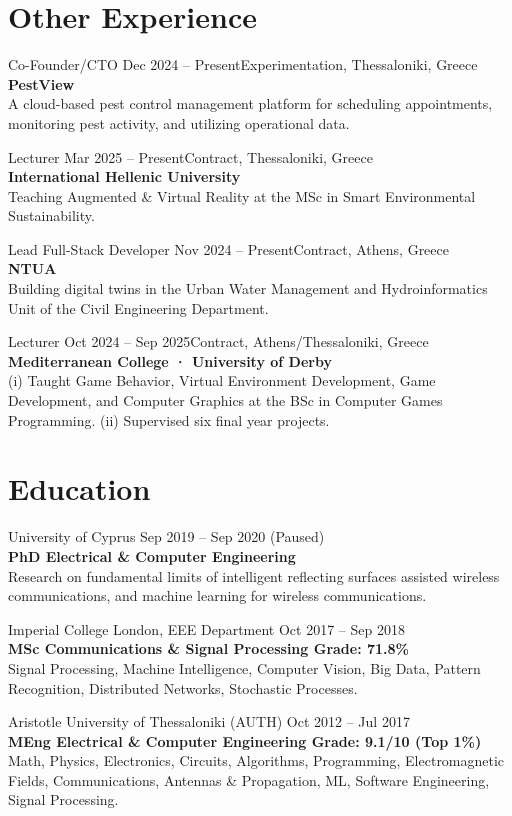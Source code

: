 \documentclass[a4paper,10pt]{article}
\newcommand{\entry}[4]{%
  \vspace{5pt}
  {\fontsize{9}{11}\selectfont\color{texttertiary}#1\hfill#2}\\[1pt]
  {\fontsize{10.5}{13}\selectfont\bfseries #3}\\[1pt]
  {\fontsize{9}{12}\selectfont\color{textsecondary}#4}
  \vspace{2pt}
}
\newcommand{\entrycompact}[3]{%
  \vspace{4pt}
  {\fontsize{9}{11}\selectfont\color{texttertiary}#1}\\[1pt]
  {\fontsize{10}{12}\selectfont\bfseries #2}\\[1pt]
  {\fontsize{9}{12}\selectfont\color{textsecondary}#3}
  \vspace{1pt}
}
\begin{document}
\section{Other Experience}

\entry{Co-Founder/CTO \hfill Dec 2024 -- Present}{Experimentation, Thessaloniki, Greece}
{PestView}
{A cloud-based pest control management platform for scheduling appointments, monitoring pest activity, and utilizing operational data.}

\entry{Lecturer \hfill Mar 2025 -- Present}{Contract, Thessaloniki, Greece}
{International Hellenic University}
{Teaching Augmented \& Virtual Reality at the MSc in Smart Environmental Sustainability.}

\entry{Lead Full-Stack Developer \hfill Nov 2024 -- Present}{Contract, Athens, Greece}
{NTUA}
{Building digital twins in the Urban Water Management and Hydroinformatics Unit of the Civil Engineering Department.}

\entry{Lecturer \hfill Oct 2024 -- Sep 2025}{Contract, Athens/Thessaloniki, Greece}
{Mediterranean College · University of Derby}
{(i) Taught Game Behavior, Virtual Environment Development, Game Development, and Computer Graphics at the BSc in Computer Games Programming. (ii) Supervised six final year projects.}

\section{Education}

\entrycompact{University of Cyprus \hfill Sep 2019 -- Sep 2020 {\color{texttertiary}(Paused)}}
{PhD Electrical \& Computer Engineering}
{Research on fundamental limits of intelligent reflecting surfaces assisted wireless communications, and machine learning for wireless communications.}

\entrycompact{Imperial College London, EEE Department \hfill Oct 2017 -- Sep 2018}
{MSc Communications \& Signal Processing \hfill {\normalfont\color{texttertiary}Grade: 71.8\%}}
{Signal Processing, Machine Intelligence, Computer Vision, Big Data, Pattern Recognition, Distributed Networks, Stochastic Processes.}

\entrycompact{Aristotle University of Thessaloniki (AUTH) \hfill Oct 2012 -- Jul 2017}
{MEng Electrical \& Computer Engineering \hfill {\normalfont\color{texttertiary}Grade: 9.1/10 (Top 1\%)}}
{Math, Physics, Electronics, Circuits, Algorithms, Programming, Electromagnetic Fields, Communications, Antennas \& Propagation, ML, Software Engineering, Signal Processing.}
\end{document}
